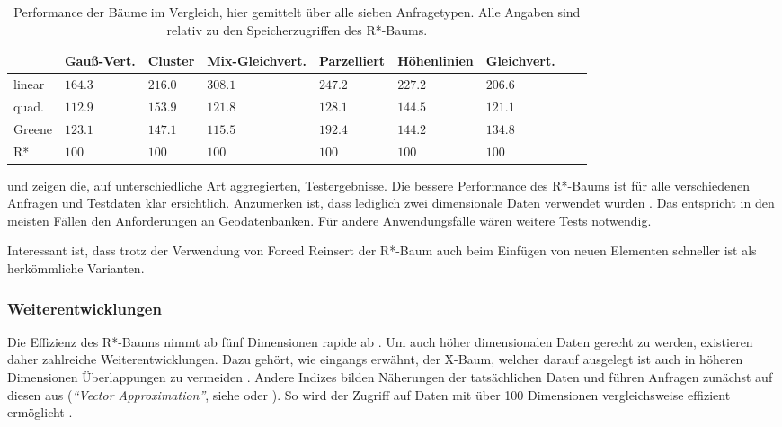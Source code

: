\documentclass[runningheads,a4paper]{llncs}
\begin{document}
	\begin{table}
	\caption{Performance der Bäume im Vergleich, hier gemittelt über alle sieben Anfragetypen. Alle Angaben sind relativ zu den Speicherzugriffen des R*-Baums.}
	\label{tab:benchmark-data}
	\begin{tabularx}{\textwidth}{l|X|X|X|X|X|X|X|X}
		& Gauß-Vert. & Cluster & Mix-Gleichvert. & Parzelliert & Höhenlinien & Gleichvert. \\
		\hline \hline
		linear	& $164.3$ & $216.0$ & $308.1$ & $247.2$ & $227.2$ & $206.6$	\\ \hline
		quad.		&	$112.9$ & $153.9$ & $121.8$ & $128.1$ & $144.5$ & $121.1$	\\ \hline
		Greene	& $123.1$ & $147.1$ & $115.5$ & $192.4$ & $144.2$ & $134.8$	\\ \hline
		R*			& $100$		& $100$		& $100$		& $100$		& $100$		& $100$
	\end{tabularx}
	\end{table}

	 und  zeigen die, auf unterschiedliche Art aggregierten, Testergebnisse. Die bessere Performance des R*-Baums ist für alle verschiedenen Anfragen und Testdaten klar ersichtlich. Anzumerken ist, dass lediglich zwei dimensionale Daten verwendet wurden \citep[328][vgl.]{Beckmann:1990}. Das entspricht in den meisten Fällen den Anforderungen an Geodatenbanken. Für andere Anwendungsfälle wären weitere Tests notwendig.

	Interessant ist, dass trotz der Verwendung von Forced Reinsert der R*-Baum auch beim Einfügen von neuen Elementen schneller ist als herkömmliche Varianten.
	

	\subsubsection{Weiterentwicklungen} %
	\label{ssub:weiterentwicklungen}

	Die Effizienz des R*-Baums nimmt ab fünf Dimensionen rapide ab \citep[vgl.][29]{Kriegel:1996}. Um auch höher dimensionalen Daten gerecht zu werden, existieren daher zahlreiche Weiterentwicklungen. Dazu gehört, wie eingangs erwähnt, der X-Baum, welcher darauf ausgelegt ist auch in höheren Dimensionen Überlappungen zu vermeiden \citep[vgl.][]{Kriegel:1996}.
	Andere Indizes bilden Näherungen der tatsächlichen Daten und führen Anfragen zunächst auf diesen aus (\emph{\enquote{Vector Approximation}}, siehe \cite{Gibas:2008} oder \cite{Daoudi:2008}). So wird der Zugriff auf Daten mit über 100 Dimensionen vergleichsweise effizient ermöglicht \citep[vgl.][]{Daoudi:2008}.
	
\end{document}
